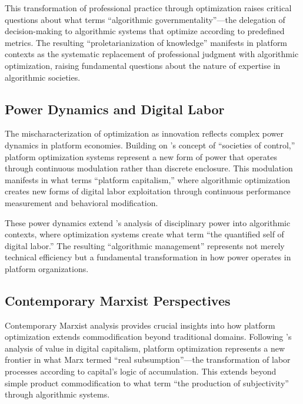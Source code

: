 This transformation of professional practice through optimization raises critical questions about what \textcite{stiegler2018} terms ``algorithmic governmentality''---the delegation of decision-making to algorithmic systems that optimize according to predefined metrics. The resulting ``proletarianization of knowledge'' \parencite{stiegler2010} manifests in platform contexts as the systematic replacement of professional judgment with algorithmic optimization, raising fundamental questions about the nature of expertise in algorithmic societies.

\subsection{Power Dynamics and Digital Labor}
The mischaracterization of optimization as innovation reflects complex power dynamics in platform economies. Building on \textcite{deleuze1992}'s concept of ``societies of control,'' platform optimization systems represent a new form of power that operates through continuous modulation rather than discrete enclosure. This modulation manifests in what \textcite{srnicek2017} terms ``platform capitalism,'' where algorithmic optimization creates new forms of digital labor exploitation through continuous performance measurement and behavioral modification.

These power dynamics extend \textcite{foucault1977}'s analysis of disciplinary power into algorithmic contexts, where optimization systems create what \textcite{moore2016} term ``the quantified self of digital labor.'' The resulting ``algorithmic management'' \parencite{kellogg2020} represents not merely technical efficiency but a fundamental transformation in how power operates in platform organizations.

\subsection{Contemporary Marxist Perspectives}
Contemporary Marxist analysis provides crucial insights into how platform optimization extends commodification beyond traditional domains. Following \textcite{harvey2018}'s analysis of value in digital capitalism, platform optimization represents a new frontier in what Marx termed ``real subsumption''---the transformation of labor processes according to capital's logic of accumulation. This extends beyond simple product commodification to what \textcite{hardt2017} term ``the production of subjectivity'' through algorithmic systems.

